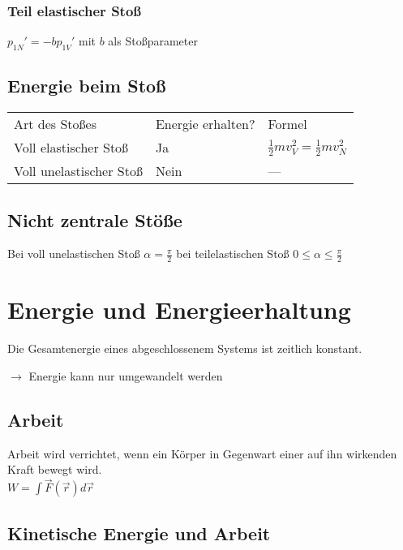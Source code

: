 \documentclass[a4paper,12pt]{report}
\begin{document}
\subsubsection{Teil elastischer Stoß}
$p_{1N}' = -b p_{1V}'  $  mit $b$ als Stoßparameter \\

\subsection{Energie beim Stoß}

\begin{tabular}{l|l|l}
Art des Stoßes & Energie erhalten? & Formel\\
Voll elastischer Stoß & Ja & $\frac{1}{2} mv_{V}^2=\frac{1}{2} mv^2_N $ \\
Voll unelastischer Stoß & Nein & --- \\
\end{tabular}

\subsection{Nicht zentrale Stöße}

Bei voll unelastischen Stoß $\alpha = \frac{\pi}{2} $ bei teilelastischen Stoß $ 0 \le \alpha \le \frac{\pi}{2} $ \\



\section{Energie und Energieerhaltung}

Die Gesamtenergie eines abgeschlossenem Systems ist zeitlich konstant.
		
$ \rightarrow$ Energie kann nur umgewandelt werden

\subsection{Arbeit}

Arbeit wird verrichtet, wenn ein Körper in Gegenwart einer auf ihn wirkenden Kraft bewegt wird.\\

$ W = \int{\vec{F}(\vec{r})d\vec{r}} $ \\

\subsection{Kinetische Energie und Arbeit}
\end{document}
